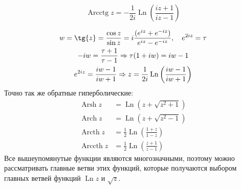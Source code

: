 \documentclass[a4paper, 12pt]{report}
\DeclareMathOperator\Arcctg{Arcctg}
\DeclareMathOperator\Arsh{Arsh}
\DeclareMathOperator\Arch{Arch}
\DeclareMathOperator\Arcth{Arcth}
\DeclareMathOperator\Arccth{Arccth}
\DeclareMathOperator\Ln{Ln}
\begin{document}
\begin{equation*}
    \boxed{\Arcctg z = -\frac{1}{2i} \Ln \left( \frac{iz + 1}{iz - 1} \right)}
\end{equation*}

\begin{gather*}
    w=\tg{z}=\frac{\cos z}{\sin z} = i\frac{(e^{iz} + e^{-iz})}{e^{iz} - e^{-iz}}, \quad e^{2iz} = \tau \\
    -iw = \frac{\tau + 1}{\tau - 1} \Rightarrow \tau(1 + iw) = iw - 1\\
    e^{2iz} = \frac{iw - 1}{iw + 1} \Rightarrow z = \frac{1}{2i} \Ln \left( \frac{iw - 1}{iw + 1} \right)
\end{gather*}
Точно так же обратные гиперболические:
\begin{align*}
    \Arsh z &= \Ln \left( z + \sqrt{z^2 + 1} \right) \\
    \Arch z &= \Ln \left( z + \sqrt{z^2 - 1} \right) \\
    \Arcth z &= \frac{1}{2} \Ln \left( \frac{1 + z}{1 - z} \right) \\
    \Arccth z &= \frac{1}{2} \Ln \left( \frac{z + 1}{z - 1} \right)
\end{align*}
Все вышеупомянутые функции являются многозначными, поэтому можно рассматривать главные ветви этих функций, которые получаются выбором главных ветвей функций $\Ln z$ и $\sqrt z$.
\end{document}
